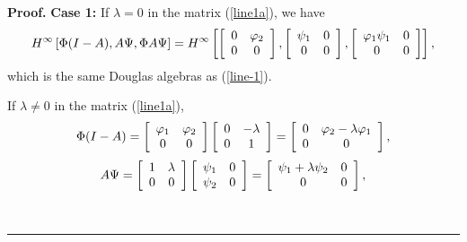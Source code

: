 \documentclass[10pt,a4paper]{amsart}
\newenvironment{proof}[1][Proof]{\noindent\textbf{#1.} }{\ \rule{0.5em}{0.5em}}
\begin{document}
\begin{proof}
\textbf{{Case 1:}} If $\lambda=0$ in the matrix (\ref{line1a}), we have
\[
H^{\infty}\left[  \Phi(I-A),A\Psi,\Phi A\Psi\right]  =H^{\infty} \left[
\left[
\begin{array}
[c]{cc}%
0 & \varphi_{2}\\
0 & 0
\end{array}
\right]  ,\left[
\begin{array}
[c]{cc}%
\psi_{1} & 0\\
0 & 0
\end{array}
\right]  ,\left[
\begin{array}
[c]{cc}%
\varphi_{1}\psi_{1} & 0\\
0 & 0
\end{array}
\right]  \right]  ,
\]
which is the same Douglas algebras as (\ref{line-1}).

If $\lambda\neq0$ in the matrix (\ref{line1a}),%
\begin{align}
\Phi(I-A)=\left[
\begin{array}
[c]{cc}%
\varphi_{1} & \varphi_{2}\\
0 & 0
\end{array}
\right]  \left[
\begin{array}
[c]{cc}%
0 & -\lambda\\
0 & 1
\end{array}
\right]  =\left[
\begin{array}
[c]{cc}%
0 & \varphi_{2}-\lambda\varphi_{1}\\
0 & 0
\end{array}
\right]  ,\nonumber
\end{align}
\begin{align}
A\Psi= \left[
\begin{array}
[c]{cc}%
1 & \lambda\\
0 & 0
\end{array}
\right]  \left[
\begin{array}
[c]{cc}%
\psi_{1} & 0\\
\psi_{2} & 0
\end{array}
\right]  =\left[
\begin{array}
[c]{cc}%
\psi_{1}+\lambda\psi_{2} & 0\\
0 & 0
\end{array}
\right]  ,\nonumber
\end{align}
%


\end{proof}
\end{document}
